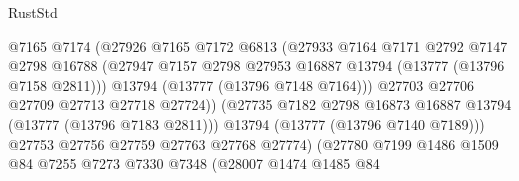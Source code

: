 \begin{lexlean}{RustStd}
\begin{coremodule}
                                      @7165
                                      @7174
                                      (@27926
                                        @7165
                                        @7172
                                        @6813
                                        (@27933
                                          @7164
                                          @7171
                                          @2792
                                          @7147
                                          @2798
                                          @16788
                                          (@27947
                                            @7157
                                            @2798
                                            @27953
                                            @16887
                                            @13794
                                            (@13777 (@13796 @7158 @2811)))
                                          @13794
                                          (@13777 (@13796 @7148 @7164)))
                                        @27703
                                        @27706
                                        @27709
                                        @27713
                                        @27718
                                        @27724))
                                    (@27735
                                      @7182
                                      @2798
                                      @16873
                                      @16887
                                      @13794
                                      (@13777 (@13796 @7183 @2811)))
                                    @13794
                                    (@13777 (@13796 @7140 @7189)))
                                  @27753
                                  @27756
                                  @27759
                                  @27763
                                  @27768
                                  @27774)
                                (@27780
                                  @7199
                                  @1486
                                  @1509
                                  @84
                                  @7255
                                  @7273
                                  @7330
                                  @7348
                                  (@28007
                                    @1474
                                    @1485
                                    @84

\end{coremodule}
\end{lexlean}
